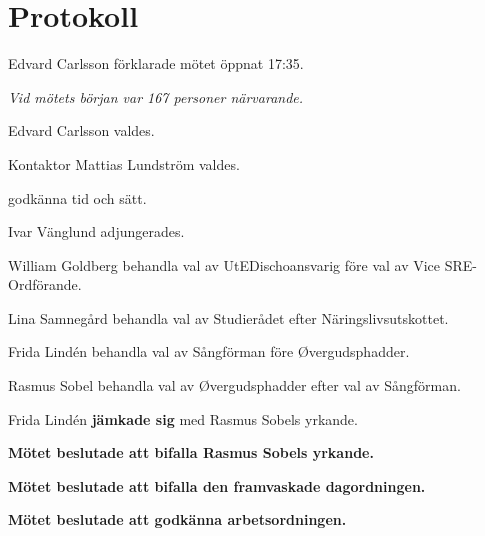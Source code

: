 \documentclass[10pt]{article}
\def\mo{Edvard Carlsson}
\def\ms{Mattias Lundström}
\begin{document}
\section*{Protokoll}
\begin{paragrafer}
{\mo} förklarade mötet öppnat 17:35.

\emph{Vid mötets början var 167 personer närvarande.}

{\mo} valdes.

Kontaktor {\ms} valdes.


\Mba godkänna tid och sätt.


\valavj

Ivar Vänglund adjungerades.




William Goldberg \ypa behandla val av UtEDischoansvarig före val av Vice SRE-Ordförande. 

\textbf{\Mbaby}

Lina Samnegård \ypa behandla val av Studierådet efter Näringslivsutskottet.

\textbf{\Mbaby}

Frida Lindén \ypa behandla val av Sångförman före Øvergudsphadder.

Rasmus Sobel \ypa behandla val av Øvergudsphadder efter val av Sångförman. 

Frida Lindén \textbf{jämkade sig} med Rasmus Sobels yrkande. 

\textbf{Mötet beslutade att bifalla Rasmus Sobels yrkande.}

\textbf{Mötet beslutade att bifalla den framvaskade dagordningen.}


\textbf{Mötet beslutade att godkänna arbetsordningen.}


\end{paragrafer}
\end{document}
